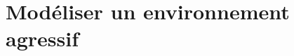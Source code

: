 \chapter{Modéliser un environnement agressif}
\label{chap:contribution_environnement}
\minitoc






